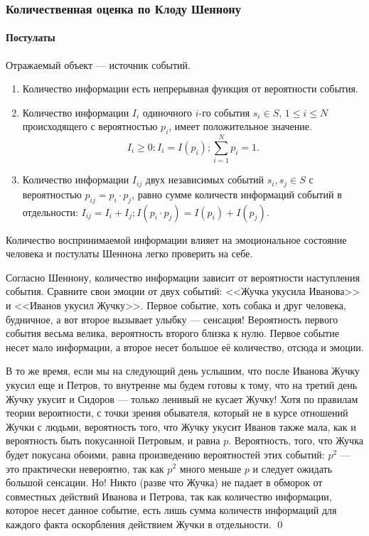 \begin{frame}
    \frametitle{Количественная оценка по Клоду Шеннону}
    \framesubtitle{Постулаты}
    
    Отражаемый объект --- источник \alert{событий}.
    \begin{enumerate}
        \item Количество информации есть непрерывная функция от вероятности события.

        \item Количество информации $I_i$ одиночного $i$-го события $s_i\in S$, $1\leq i\leq N$ происходящего с вероятностью $p_i$, имеет положительное значение. 
        \[I_i\geq 0; I_i=I(p_i); \sum_{i=1}^{N}p_i = 1.\]

        \item Количество информации $I_{ij}$ двух независимых событий $s_i,s_j\in S$ с вероятностью $p_{ij}=p_i\cdot p_j$, равно сумме количеств информаций событий в отдельности:
        \(I_{ij}=I_i+I_j; I(p_i\cdot p_j)=I(p_i) + I(p_j).\)
    \end{enumerate}
\end{frame}

\begin{example}
    Количество воспринимаемой информации влияет на эмоциональное состояние человека и постулаты Шеннона легко проверить на себе.
    
    Согласно Шеннону, количество информации зависит от вероятности наступления события. Сравните свои эмоции от двух событий: <<Жучка укусила Иванова>> и <<Иванов укусил Жучку>>. Первое событие, хоть собака и друг человека, будничное, а вот второе вызывает улыбку --- сенсация! Вероятность первого события весьма велика, вероятность второго близка к нулю. Первое событие несет мало информации, а второе несет большое её количество, отсюда и эмоции.

    В то же время, если мы на следующий день услышим, что после Иванова Жучку укусил еще и Петров, то внутренне мы будем готовы к тому, что на третий день Жучку укусит и Сидоров --- только ленивый не кусает Жучку! Хотя по правилам теории вероятности, с точки зрения обывателя, который не в курсе отношений Жучки с людьми, вероятность того, что Жучку укусит Иванов также мала, как и вероятность быть покусанной Петровым, и равна $p$. Вероятность, того, что Жучка будет покусана обоими, равна произведению вероятностей этих событий: $p^2$ --- это практически невероятно, так как $p^2$ много меньше $p$ и следует ожидать большой сенсации. Но! Никто (разве что Жучка) не падает в обморок от совместных действий Иванова и Петрова, так как количество информации, которое несет данное событие, есть лишь сумма количеств информаций для каждого факта оскорбления действием Жучки в отдельности.
    \qed
\end{example}

